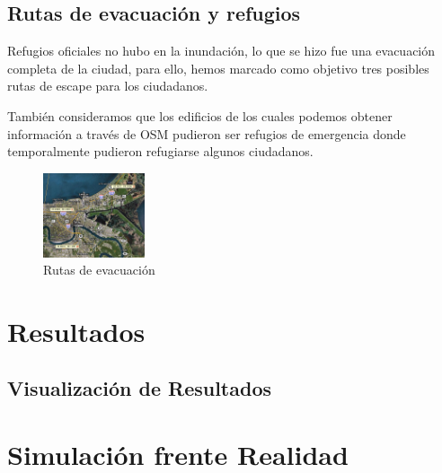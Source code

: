 \subsection*{Rutas de evacuación y refugios}

Refugios oficiales no hubo en la inundación, lo que se hizo fue una evacuación
completa de la ciudad, para ello, hemos marcado como objetivo tres posibles
rutas de escape para los ciudadanos.

También consideramos que los edificios de los cuales podemos obtener
información a través de OSM pudieron ser refugios de emergencia donde
temporalmente pudieron refugiarse algunos ciudadanos.

\begin{figure}[H]
 \centering
 \includegraphics[width=30mm]{figuras/cap6/evacuation.png}
 \caption{Rutas de evacuación}
\end{figure}

\section*{Resultados}
\subsection*{Visualización de Resultados}
\section*{Simulación frente Realidad}

